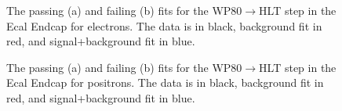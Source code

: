 \begin{thebibliography}{10}
\begin{figure}[htb]
  \begin{center}
    \caption{The passing (a) and failing (b) fits for the WP80$\to$HLT step in the Ecal Endcap for electrons.
             The data is in black, background fit in red, and signal+background fit in blue.}
  \end{center}
\end{figure}

\begin{figure}[htb]
  \begin{center}
    \caption{The passing (a) and failing (b) fits for the WP80$\to$HLT step in the Ecal Endcap for positrons.
             The data is in black, background fit in red, and signal+background fit in blue.}
  \end{center}
\end{figure}

\newpage

\end{thebibliography}
%
